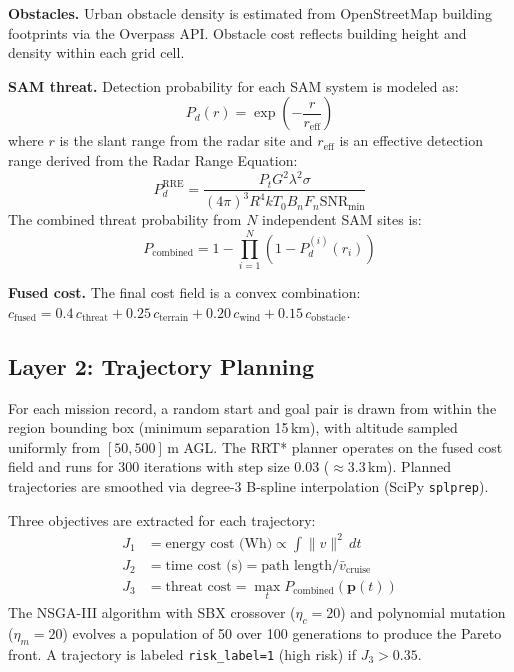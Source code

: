 \documentclass{article}
\begin{document}
\textbf{Obstacles.} Urban obstacle density is estimated from OpenStreetMap
building footprints \citep{openstreetmap} via the Overpass API. Obstacle
cost reflects building height and density within each grid cell.

\textbf{SAM threat.} Detection probability for each SAM system is modeled as:
\begin{equation}
  P_d(r) = \exp\!\left(-\frac{r}{r_\text{eff}}\right)
  \label{eq:sam_pd}
\end{equation}
where $r$ is the slant range from the radar site and $r_\text{eff}$ is an
effective detection range derived from the Radar Range Equation:
\begin{equation}
  P_d^{\text{RRE}} = \frac{P_t G^2 \lambda^2 \sigma}{(4\pi)^3 R^4 k T_0 B_n F_n \text{SNR}_\text{min}}
  \label{eq:rre}
\end{equation}
The combined threat probability from $N$ independent SAM sites is:
\begin{equation}
  P_\text{combined} = 1 - \prod_{i=1}^{N}\left(1 - P_d^{(i)}(r_i)\right)
  \label{eq:combined_threat}
\end{equation}

\textbf{Fused cost.} The final cost field is a convex combination:
$c_\text{fused} = 0.4\,c_\text{threat} + 0.25\,c_\text{terrain} + 0.20\,c_\text{wind} + 0.15\,c_\text{obstacle}$.

\subsection{Layer 2: Trajectory Planning}
\label{sec:planning}

For each mission record, a random start and goal pair is drawn from within
the region bounding box (minimum separation 15\,km), with altitude sampled
uniformly from $[50, 500]$\,m AGL. The RRT* planner \citep{karaman2011sampling}
operates on the fused cost field and runs for 300 iterations with step size
0.03\textdegree{} ($\approx$3.3\,km). Planned trajectories are smoothed via
degree-3 B-spline interpolation (SciPy \texttt{splprep}).

Three objectives are extracted for each trajectory:
\begin{align}
  J_1 &= \text{energy cost (Wh)} \propto \int \|v\|^2\,dt \\
  J_2 &= \text{time cost (s)} = \text{path length} / \bar{v}_\text{cruise} \\
  J_3 &= \text{threat cost} = \max_{t} P_\text{combined}(\mathbf{p}(t))
\end{align}
The NSGA-III algorithm \citep{deb2014evolutionary} with SBX crossover
($\eta_c = 20$) and polynomial mutation ($\eta_m = 20$) evolves a population
of 50 over 100 generations to produce the Pareto front. A trajectory is
labeled \texttt{risk\_label=1} (high risk) if $J_3 > 0.35$.
\end{document}
